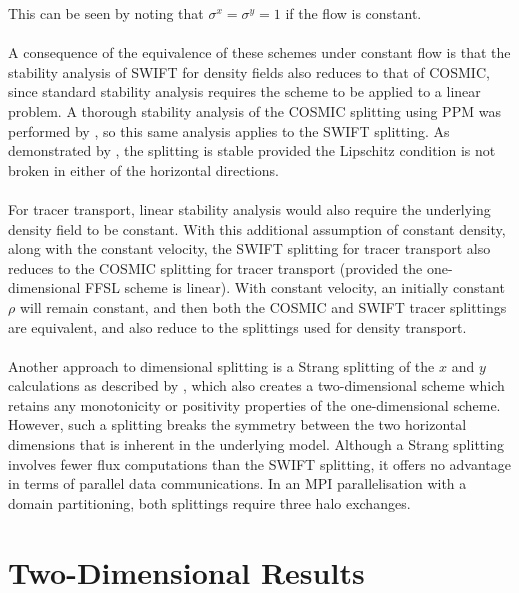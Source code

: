 \documentclass{ametsocV6.1}
\begin{document}
This can be seen by noting that $\sigma^x=\sigma^y=1$ if the flow is constant. \\
\\
A consequence of the equivalence of these schemes under constant flow is that the stability analysis of SWIFT for density fields also reduces to that of COSMIC, since standard stability analysis requires the scheme to be applied to a linear problem.
A thorough stability analysis of the COSMIC splitting using PPM was performed by \citet{lauritzen2007fvstab}, so this same analysis applies to the SWIFT splitting.
As demonstrated by \citet{lin1996ffsl}, the splitting is stable provided the Lipschitz condition is not broken in either of the horizontal directions. \\
\\
For tracer transport, linear stability analysis would also require the underlying density field to be constant.
With this additional assumption of constant density, along with the constant velocity, the SWIFT splitting for tracer transport also reduces to the COSMIC splitting for tracer transport (provided the one-dimensional FFSL scheme is linear).
With constant velocity, an initially constant $\rho$ will remain constant, and then both the COSMIC and SWIFT tracer splittings are equivalent, and also reduce to the splittings used for density transport. \\
\\
Another approach to dimensional splitting is a Strang splitting of the $x$ and $y$ calculations as described by \citet{skamarock2006limiters}, which also creates a two-dimensional scheme which retains any monotonicity or positivity properties of the one-dimensional scheme.
However, such a splitting breaks the symmetry between the two horizontal dimensions that is inherent in the underlying model.
Although a Strang splitting involves fewer flux computations than the SWIFT splitting, it offers no advantage in terms of parallel data communications.
In an MPI parallelisation with a domain partitioning, both splittings require three halo exchanges.

\section{Two-Dimensional Results} \label{sec:results2d}
\end{document}
